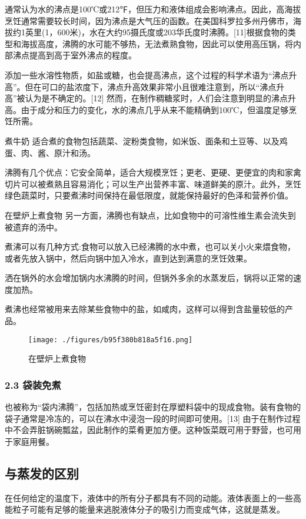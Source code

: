 通常认为水的沸点是100℃或212℉，但压力和液体组成会影响沸点。因此，高海拔烹饪通常需要较长时间，因为沸点是大气压的函数。在美国科罗拉多州丹佛市，海拔约1英里(1，600米)，水在大约95摄氏度或203华氏度时沸腾。[11]根据食物的类型和海拔高度，沸腾的水可能不够热，无法煮熟食物，因此可以使用高压锅，将内部沸点提高到高于室外沸点的程度。

添加一些水溶性物质，如盐或糖，也会提高沸点，这个过程的科学术语为“沸点升高”。但在可口的盐浓度下，沸点升高效果非常小且很难注意到，所以“沸点升高”被认为是不确定的。[12] 然而，在制作稠糖浆时，人们会注意到明显的沸点升高。由于成分和压力的变化，水的沸点几乎从来不能精确到100℃，但温度足够烹饪所需。

煮牛奶
适合煮的食物包括蔬菜、淀粉类食物，如米饭、面条和土豆等、以及鸡蛋、肉、酱、原汁和汤。

沸腾有几个优点：它安全简单，适合大规模烹饪；更老、更硬、更便宜的肉和家禽切片可以被煮熟且容易消化；可以生产出营养丰富、味道鲜美的原汁。此外，烹饪绿色蔬菜时，只要煮沸时间保持在最低限度，就能保持最好的色泽和营养价值。

在壁炉上煮食物
另一方面，沸腾也有缺点，比如食物中的可溶性维生素会流失到被遗弃的汤中。

煮沸可以有几种方式:食物可以放入已经沸腾的水中煮，也可以关小火来煨食物，或者先放入锅中，然后向锅中加入冷水，直到达到满意的烹饪效果。

洒在锅外的水会增加锅内水沸腾的时间，但锅外多余的水蒸发后，锅将以正常的速度加热。

煮沸也经常被用来去除某些食物中的盐，如咸肉，这样可以得到含盐量较低的产品。
\begin{figure}[ht]
\centering
\texttt{[image: ./figures/b95f380b818a5f16.png]}
\caption{在壁炉上煮食物} \label{fig_FT_4}
\end{figure}

\subsubsection{2.3 袋装免煮}
也被称为“袋内沸腾”，包括加热或烹饪密封在厚塑料袋中的现成食物。装有食物的袋子通常是冷冻的，可以在沸水中浸泡一段的时间即可使用。[13] 由于在制作过程中不会弄脏锅碗瓢盆，因此制作的菜肴更加方便。这种饭菜既可用于野营，也可用于家庭用餐。

\subsection{与蒸发的区别}
在任何给定的温度下，液体中的所有分子都具有不同的动能。液体表面上的一些高能粒子可能有足够的能量来逃脱液体分子的吸引力而变成气体，这就是蒸发。

